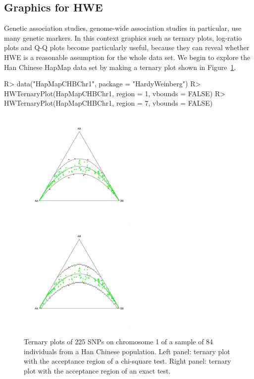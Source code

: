 \documentclass[nojss]{jss}
\begin{document}
\subsection{Graphics for HWE}
\label{subsec:graphics}

Genetic association studies, genome-wide association studies in
particular, use many genetic markers. In this context graphics such as
ternary plots, log-ratio plots and Q-Q plots become particularly
useful, because they can reveal whether HWE is a reasonable assumption
for the whole data set. We begin to explore the Han Chinese HapMap
data set by making a ternary plot shown in Figure~\ref{fig:Han}.
%
\begin{Schunk}
\begin{Sinput}
R> data("HapMapCHBChr1", package = "HardyWeinberg")
R> HWTernaryPlot(HapMapCHBChr1, region = 1, vbounds = FALSE)
R> HWTernaryPlot(HapMapCHBChr1, region = 7, vbounds = FALSE)
\end{Sinput}
\end{Schunk}
%
\begin{figure}[b!]
\centering
\includegraphics[width=0.5\textwidth, trim=40 70 20 40, clip]{HapMapCHBChr1Chisq.pdf}%
\includegraphics[width=0.5\textwidth, trim=20 70 20 40, clip]{HapMapCHBChr1Exact.pdf}
\caption{\label{fig:Han}Ternary plots of 225 SNPs on chromosome 1 of a
  sample of 84 individuals from a Han Chinese population. Left panel:
  ternary plot with the acceptance region of a chi-square test. Right
  panel: ternary plot with the acceptance region of an exact test.}
\end{figure}
\end{document}
